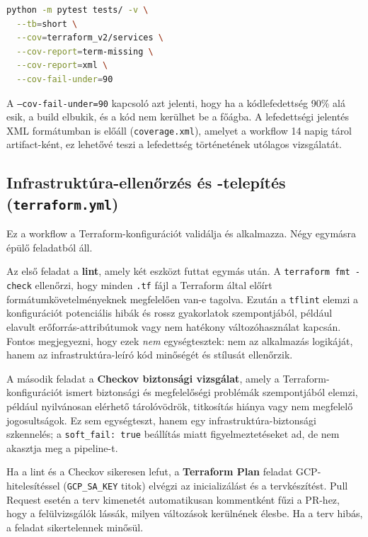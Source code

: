 \documentclass[12pt,a4paper]{article}
\begin{document}
\begin{lstlisting}[caption={A tesztfuttatás parancsa a CI-ban}, language=bash]
python -m pytest tests/ -v \
  --tb=short \
  --cov=terraform_v2/services \
  --cov-report=term-missing \
  --cov-report=xml \
  --cov-fail-under=90
\end{lstlisting}

A \texttt{--cov-fail-under=90} kapcsoló azt jelenti, hogy ha a kódlefedettség 90\%
alá esik, a build elbukik, és a kód nem kerülhet be a főágba. A lefedettségi
jelentés XML formátumban is előáll (\texttt{coverage.xml}), amelyet a workflow
14 napig tárol artifact-ként, ez lehetővé teszi a lefedettség történetének
utólagos vizsgálatát.

\subsection{Infrastruktúra-ellenőrzés és -telepítés (\texttt{terraform.yml})}

Ez a workflow a Terraform-konfigurációt validálja és alkalmazza. Négy egymásra
épülő feladatból áll.

Az első feladat a \textbf{lint}, amely két eszközt futtat egymás után. A
\texttt{terraform fmt -check} ellenőrzi, hogy minden \texttt{.tf} fájl a
Terraform által előírt formátumkövetelményeknek megfelelően van-e tagolva.
Ezután a \texttt{tflint} elemzi a konfigurációt potenciális hibák és rossz
gyakorlatok szempontjából, például elavult erőforrás-attribútumok vagy
nem hatékony változóhasználat kapcsán. Fontos megjegyezni, hogy ezek
\emph{nem} egységtesztek: nem az alkalmazás logikáját, hanem az infrastruktúra-leíró
kód minőségét és stílusát ellenőrzik.

A második feladat a \textbf{Checkov biztonsági vizsgálat}, amely a Terraform-konfigurációt
ismert biztonsági és megfelelőségi problémák szempontjából elemzi, például
nyilvánosan elérhető tárolóvödrök, titkosítás hiánya vagy nem megfelelő jogosultságok.
Ez sem egységteszt, hanem egy infrastruktúra-biztonsági szkennelés; a
\texttt{soft\_fail: true} beállítás miatt figyelmeztetéseket ad, de nem akasztja
meg a pipeline-t.

Ha a lint és a Checkov sikeresen lefut, a \textbf{Terraform Plan} feladat
GCP-hitelesítéssel (\texttt{GCP\_SA\_KEY} titok) elvégzi az inicializálást
és a tervkészítést. Pull Request esetén a terv kimenetét automatikusan kommentként
fűzi a PR-hez, hogy a felülvizsgálók lássák, milyen változások kerülnének
élesbe. Ha a terv hibás, a feladat sikertelennek minősül.
\end{document}

